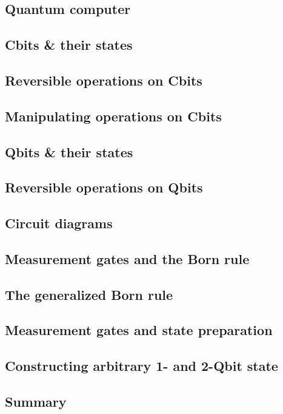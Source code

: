 \documentclass{book}
\theoremstyle{definition}
\begin{document}
\subsection{Quantum computer}
\newpage
\subsection{Cbits \& their states}
\newpage
\subsection{Reversible operations on Cbits}
\newpage
\subsection{Manipulating operations on Cbits}
\newpage
\subsection{Qbits \& their states}
\newpage
\subsection{Reversible operations on Qbits}
\newpage
\subsection{Circuit diagrams}
\newpage
\subsection{Measurement gates and the Born rule}
\newpage
\subsection{The generalized Born rule}
\newpage
\subsection{Measurement gates and state preparation}
\newpage
\subsection{Constructing arbitrary 1- and 2-Qbit state}
\newpage
\subsection{Summary}
\newpage
\end{document}
